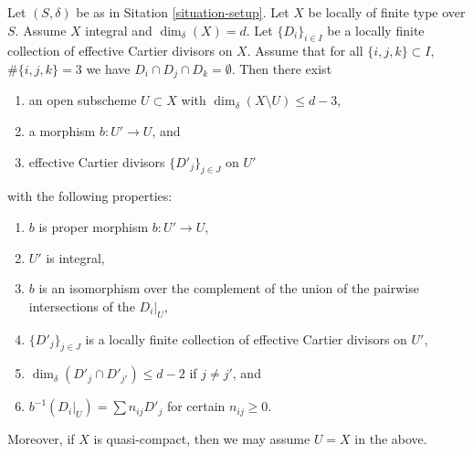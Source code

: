 \begin{lemma}
\label{lemma-blowing-up-intersections}
Let $(S, \delta)$ be as in Sitation \ref{situation-setup}.
Let $X$ be locally of finite type over $S$.
Assume $X$ integral and $\dim_\delta(X) = d$.
Let $\{D_i\}_{i \in I}$ be a locally finite collection of
effective Cartier divisors on $X$.
Assume that for all $\{i, j, k\} \subset I$, $\#\{i, j, k\} = 3$
we have $D_i \cap D_j \cap D_k = \emptyset$.
Then there exist
\begin{enumerate}
\item an open subscheme $U \subset X$ with
$\dim_\delta(X \setminus U) \leq d - 3$,
\item a morphism $b : U' \to U$, and
\item effective Cartier divisors $\{D'_j\}_{j \in J}$ on $U'$
\end{enumerate}
with the following properties:
\begin{enumerate}
\item $b$ is proper morphism $b : U' \to U$,
\item $U'$ is integral,
\item $b$ is an isomorphism over the complement of the union of the pairwise
intersections of the $D_i|_U$,
\item $\{D'_j\}_{j \in J}$ is a locally finite collection of effective
Cartier divisors on $U'$,
\item $\dim_\delta(D'_j \cap D'_{j'}) \leq d - 2$ if $j \not = j'$, and
\item $b^{-1}(D_i|_U) = \sum n_{ij} D'_j$ for certain $n_{ij} \geq 0$.
\end{enumerate}
Moreover, if $X$ is quasi-compact, then we may assume $U = X$ in the above.
\end{lemma}

